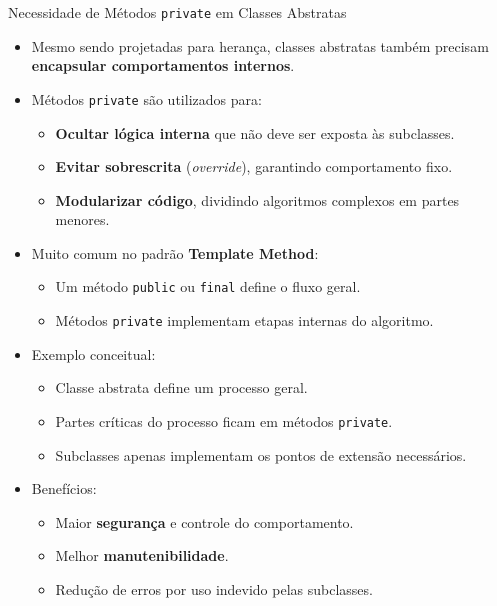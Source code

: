 \documentclass[9pt]{beamer}
\begin{document}
\begin{frame}{Necessidade de Métodos \texttt{private} em Classes Abstratas}
    \begin{itemize}
        \item Mesmo sendo projetadas para herança, classes abstratas também precisam \textbf{encapsular comportamentos internos}.
        
        \item Métodos \texttt{private} são utilizados para:
        \begin{itemize}
            \item \textbf{Ocultar lógica interna} que não deve ser exposta às subclasses.
            \item \textbf{Evitar sobrescrita} (\textit{override}), garantindo comportamento fixo.
            \item \textbf{Modularizar código}, dividindo algoritmos complexos em partes menores.
        \end{itemize}
        
        \item Muito comum no padrão \textbf{Template Method}:
        \begin{itemize}
            \item Um método \texttt{public} ou \texttt{final} define o fluxo geral.
            \item Métodos \texttt{private} implementam etapas internas do algoritmo.
        \end{itemize}
        
        \item Exemplo conceitual:
        \begin{itemize}
            \item Classe abstrata define um processo geral.
            \item Partes críticas do processo ficam em métodos \texttt{private}.
            \item Subclasses apenas implementam os pontos de extensão necessários.
        \end{itemize}
        
        \item Benefícios:
        \begin{itemize}
            \item Maior \textbf{segurança} e controle do comportamento.
            \item Melhor \textbf{manutenibilidade}.
            \item Redução de erros por uso indevido pelas subclasses.
        \end{itemize}
    \end{itemize}
\end{frame}
\end{document}
